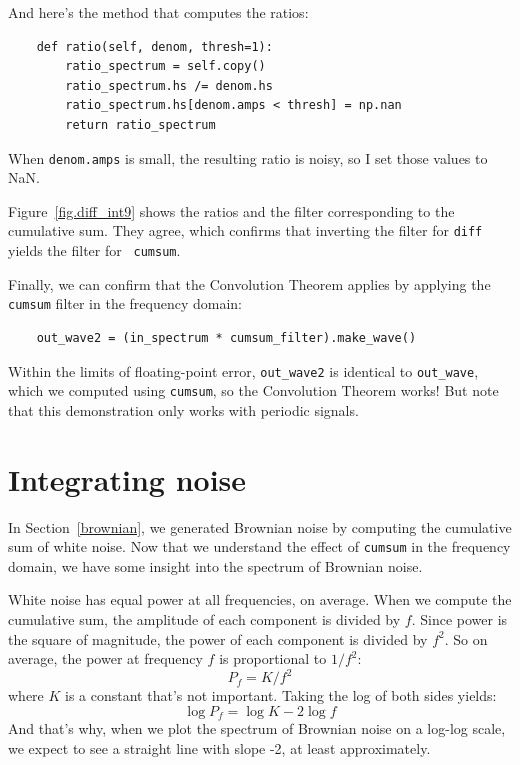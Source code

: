 \documentclass[12pt]{book}
\begin{document}
And here's the method that computes the ratios:

\begin{verbatim}
    def ratio(self, denom, thresh=1):
        ratio_spectrum = self.copy()
        ratio_spectrum.hs /= denom.hs
        ratio_spectrum.hs[denom.amps < thresh] = np.nan
        return ratio_spectrum
\end{verbatim}

When {\tt denom.amps} is small, the resulting ratio is noisy,
so I set those values to NaN.

Figure~\ref{fig.diff_int9} shows the ratios and the filter
corresponding to the cumulative sum.  They agree, which confirms that
inverting the filter for {\tt diff} yields the filter for {\tt
  cumsum}.

Finally, we can confirm that the Convolution Theorem applies by
applying the {\tt cumsum} filter in the frequency domain:

\begin{verbatim}
    out_wave2 = (in_spectrum * cumsum_filter).make_wave()
\end{verbatim}

Within the limits of floating-point error, \verb"out_wave2" is
identical to \verb"out_wave", which we computed using {\tt cumsum}, so
the Convolution Theorem works!  But note that this demonstration only
works with periodic signals.


\section{Integrating noise}

In Section~\ref{brownian}, we generated Brownian noise by computing the
cumulative sum of white noise.
Now that we understand the effect of {\tt cumsum} in the frequency
domain, we have some insight into the spectrum of Brownian noise.

White noise has equal power at all frequencies, on average.  When we
compute the cumulative sum, the amplitude of each component is divided
by $f$.  Since power is the square of magnitude, the power of each
component is divided by $f^2$.  So on average, the power at frequency
$f$ is proportional to $1 / f^2$:
%
\[ P_f = K / f^2 \]
%
where $K$ is a constant that's not important.
Taking the log of both sides yields:
%
\[ \log P_f = \log K - 2 \log f \]
%
And that's why, when we plot the spectrum of Brownian noise on a
log-log scale, we expect to see a straight line with slope -2, at
least approximately.
\end{document}
